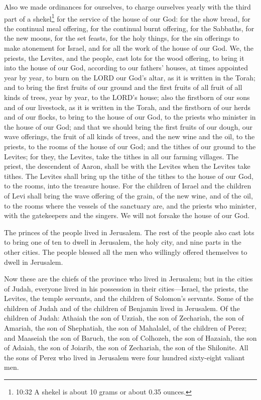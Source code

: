\myverse{}Also we made ordinances for ourselves, to charge ourselves yearly
with the third part of a shekel\footnote{10:32 A shekel is about 10 grams or about 0.35 ounces.} for the service of the house of our
God:
\myverse{}for the show bread, for the continual meal offering, for the continual burnt
offering, for the Sabbaths, for the new moons, for the set feasts, for the holy things, for the sin offerings
to make atonement for Israel, and for all the work of the house of our God.
\myverse{}We, the priests, the Levites, and the people, cast lots for the wood offering,
to bring it into the house of our God, according to our fathers’ houses, at times appointed year by year,
to burn on the LORD our God’s altar, as it is written in the Torah;
\myverse{}and to bring the first fruits of our ground and the first fruits of all fruit
of all kinds of trees, year by year, to the LORD’s house;
\myverse{}also the firstborn of our sons and of our livestock, as it is written in the Torah,
and the firstborn of our herds and of our flocks, to bring to the house of our God, to the priests who
minister in the house of our God;
\myverse{}and that we should bring the first fruits of our dough, our wave offerings,
the fruit of all kinds of trees, and the new wine and the oil, to the priests, to the rooms of the house
of our God; and the tithes of our ground to the Levites; for they, the Levites, take the tithes in all
our farming villages.
\myverse{}The priest, the descendent of Aaron, shall be with the Levites when the Levites
take tithes. The Levites shall bring up the tithe of the tithes to the house of our God, to the rooms,
into the treasure house.
\myverse{}For the children of Israel and the children of Levi shall bring the wave
offering of the grain, of the new wine, and of the oil, to the rooms where the vessels of the sanctuary
are, and the priests who minister, with the gatekeepers and the singers. We will not forsake the house
of our God.


\mychapter{} \myverse*{}The princes of the people lived in Jerusalem. The rest of the
people also cast lots to bring one of ten to dwell in Jerusalem, the holy city, and nine parts in the
other cities.
\myverse{}The people blessed all the men who willingly offered themselves to dwell in
Jerusalem.

\myverse{}Now these are the chiefs of the province who lived in Jerusalem;
but in the cities of Judah, everyone lived in his possession in their cities—Israel, the priests, the
Levites, the temple servants, and the children of Solomon’s servants.
\myverse{}Some of the children of Judah and of the children of Benjamin lived in Jerusalem.
Of the children of Judah: Athaiah the son of Uzziah, the son of Zechariah, the son of Amariah, the son
of Shephatiah, the son of Mahalalel, of the children of Perez;
\myverse{}and Maaseiah the son of Baruch, the son of Colhozeh, the son of Hazaiah, the
son of Adaiah, the son of Joiarib, the son of Zechariah, the son of the Shilonite.
\myverse{}All the sons of Perez who lived in Jerusalem were four hundred sixty-eight
valiant men.


